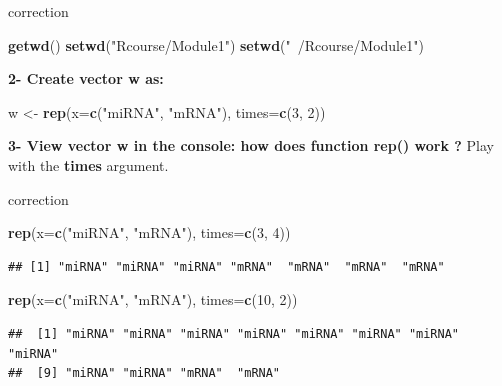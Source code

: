 \documentclass[]{book}
\newenvironment{Shaded}{\begin{snugshade}}{\end{snugshade}}
\newcommand{\DataTypeTok}[1]{\textcolor[rgb]{0.13,0.29,0.53}{#1}}
\newcommand{\DecValTok}[1]{\textcolor[rgb]{0.00,0.00,0.81}{#1}}
\newcommand{\KeywordTok}[1]{\textcolor[rgb]{0.13,0.29,0.53}{\textbf{#1}}}
\newcommand{\NormalTok}[1]{#1}
\newcommand{\StringTok}[1]{\textcolor[rgb]{0.31,0.60,0.02}{#1}}
\begin{document}
correction

\begin{Shaded}
\begin{Highlighting}[]
\KeywordTok{getwd}\NormalTok{()}
\KeywordTok{setwd}\NormalTok{(}\StringTok{"Rcourse/Module1"}\NormalTok{)}
\KeywordTok{setwd}\NormalTok{(}\StringTok{"~/Rcourse/Module1"}\NormalTok{)}
\end{Highlighting}
\end{Shaded}

\textbf{2- Create vector w as:}

\begin{Shaded}
\begin{Highlighting}[]
\NormalTok{w <-}\StringTok{ }\KeywordTok{rep}\NormalTok{(}\DataTypeTok{x=}\KeywordTok{c}\NormalTok{(}\StringTok{"miRNA"}\NormalTok{, }\StringTok{"mRNA"}\NormalTok{), }\DataTypeTok{times=}\KeywordTok{c}\NormalTok{(}\DecValTok{3}\NormalTok{, }\DecValTok{2}\NormalTok{))}
\end{Highlighting}
\end{Shaded}

\textbf{3- View vector w in the console: how does function rep() work ?}
Play with the \textbf{times} argument.

correction

\begin{Shaded}
\begin{Highlighting}[]
\KeywordTok{rep}\NormalTok{(}\DataTypeTok{x=}\KeywordTok{c}\NormalTok{(}\StringTok{"miRNA"}\NormalTok{, }\StringTok{"mRNA"}\NormalTok{), }\DataTypeTok{times=}\KeywordTok{c}\NormalTok{(}\DecValTok{3}\NormalTok{, }\DecValTok{4}\NormalTok{))}
\end{Highlighting}
\end{Shaded}

\begin{verbatim}
## [1] "miRNA" "miRNA" "miRNA" "mRNA"  "mRNA"  "mRNA"  "mRNA"
\end{verbatim}

\begin{Shaded}
\begin{Highlighting}[]
\KeywordTok{rep}\NormalTok{(}\DataTypeTok{x=}\KeywordTok{c}\NormalTok{(}\StringTok{"miRNA"}\NormalTok{, }\StringTok{"mRNA"}\NormalTok{), }\DataTypeTok{times=}\KeywordTok{c}\NormalTok{(}\DecValTok{10}\NormalTok{, }\DecValTok{2}\NormalTok{))}
\end{Highlighting}
\end{Shaded}

\begin{verbatim}
##  [1] "miRNA" "miRNA" "miRNA" "miRNA" "miRNA" "miRNA" "miRNA" "miRNA"
##  [9] "miRNA" "miRNA" "mRNA"  "mRNA"
\end{verbatim}
\end{document}
